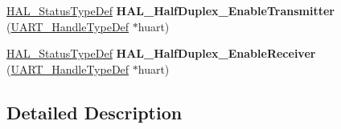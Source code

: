 \begin{DoxyCompactItemize}
\item 
\mbox{\label{group___u_a_r_t___exported___functions___group3_ga58d73e260a5536fb9cb40d7d2fe2b4bb}} 
\mbox{\hyperlink{stm32f7xx__hal__def_8h_a63c0679d1cb8b8c684fbb0632743478f}{H\+A\+L\+\_\+\+Status\+Type\+Def}} {\bfseries H\+A\+L\+\_\+\+Half\+Duplex\+\_\+\+Enable\+Transmitter} (\mbox{\hyperlink{group___u_a_r_t___exported___types_ga7adf4f3e4c3ecde572be5925c915a967}{U\+A\+R\+T\+\_\+\+Handle\+Type\+Def}} $\ast$huart)
\item 
\mbox{\label{group___u_a_r_t___exported___functions___group3_ga396ebbcdbe352c3393ad3007614383ac}} 
\mbox{\hyperlink{stm32f7xx__hal__def_8h_a63c0679d1cb8b8c684fbb0632743478f}{H\+A\+L\+\_\+\+Status\+Type\+Def}} {\bfseries H\+A\+L\+\_\+\+Half\+Duplex\+\_\+\+Enable\+Receiver} (\mbox{\hyperlink{group___u_a_r_t___exported___types_ga7adf4f3e4c3ecde572be5925c915a967}{U\+A\+R\+T\+\_\+\+Handle\+Type\+Def}} $\ast$huart)
\end{DoxyCompactItemize}


\subsection{Detailed Description}
